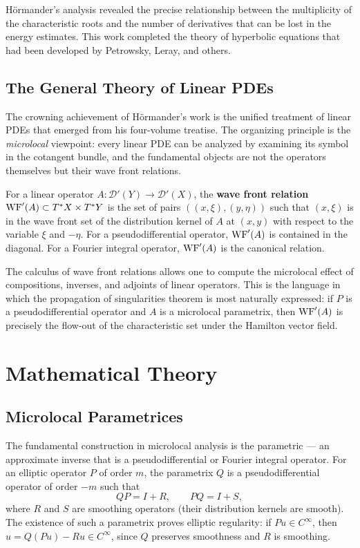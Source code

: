 H\"ormander's analysis revealed the precise relationship between the
multiplicity of the characteristic roots and the number of derivatives
that can be lost in the energy estimates. This work completed the
theory of hyperbolic equations that had been developed by
Petrowsky, Leray, and others.

\subsection{The General Theory of Linear PDEs}

The crowning achievement of H\"ormander's work is the unified treatment
of linear PDEs that emerged from his four-volume treatise. The
organizing principle is the \textit{microlocal} viewpoint: every linear
PDE can be analyzed by examining its symbol in the cotangent bundle,
and the fundamental objects are not the operators themselves but their
wave front relations.

\begin{definition}
For a linear operator \(A: \mathcal{D}'(Y) \to \mathcal{D}'(X)\), the
\textbf{wave front relation} \(\operatorname{WF}'(A) \subset T^*X \times T^*Y\) is
the set of pairs \(((x,\xi), (y,\eta))\) such that \((x,\xi)\) is in
the wave front set of the distribution kernel of \(A\) at \((x,y)\)
with respect to the variable \(\xi\) and \(-\eta\). For a
pseudodifferential operator, \(\operatorname{WF}'(A)\) is contained in the diagonal.
For a Fourier integral operator, \(\operatorname{WF}'(A)\) is the canonical relation.
\end{definition}

The calculus of wave front relations allows one to compute the
microlocal effect of compositions, inverses, and adjoints of linear
operators. This is the language in which the propagation of
singularities theorem is most naturally expressed: if \(P\) is a
pseudodifferential operator and \(A\) is a microlocal parametrix, then
\(\operatorname{WF}'(A)\) is precisely the flow-out of the characteristic set under
the Hamilton vector field.

\section{Mathematical Theory}

\subsection{Microlocal Parametrices}

The fundamental construction in microlocal analysis is the parametric
--- an approximate inverse that is a pseudodifferential or Fourier
integral operator. For an elliptic operator \(P\) of order \(m\), the
parametrix \(Q\) is a pseudodifferential operator of order \(-m\) such
that
\[
Q P = I + R, \qquad P Q = I + S,
\]
where \(R\) and \(S\) are smoothing operators (their distribution
kernels are smooth). The existence of such a parametrix proves elliptic
regularity: if \(Pu \in C^\infty\), then \(u = Q(Pu) - Ru \in C^\infty\),
since \(Q\) preserves smoothness and \(R\) is smoothing.

